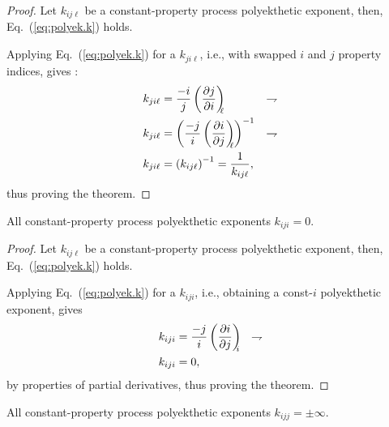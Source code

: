     \begin{proof}
        Let  $k_{ij\ell}$  be  a  constant-property   process   polyekthetic   exponent,   then,
        Eq.~(\ref{eq:polyek.k}) holds.

        Applying Eq.~(\ref{eq:polyek.k}) for a $k_{ji\ell}$, i.e.,  with  swapped  $i$  and  $j$
        property indices, gives :
        \begin{align}
            k_{ji\ell} &= \frac{-i}{j} \left(\frac{\partial {{j}}}{\partial {{i}}}\right)_{\!\!\!{\ell}}
                       & \rightharpoondown\\
            k_{ji\ell} &= \left(\frac{-j}{i} \left(\frac{\partial {{i}}}{\partial {{j}}}\right)_{\!\!\!{\ell}}\right)^{-1}
                       & \rightharpoondown\\
            k_{ji\ell} &= \left(k_{ij\ell}\right)^{-1} = \frac{1}{k_{ij\ell}},
        \end{align}
        \noindent thus proving the theorem.
    \end{proof}

    \begin{theorem}\label{the:k.consti}
        All constant-property process polyekthetic exponents $k_{iji} = 0$.
    \end{theorem}

    \begin{proof}
        Let  $k_{ij\ell}$  be  a  constant-property   process   polyekthetic   exponent,   then,
        Eq.~(\ref{eq:polyek.k}) holds.

        Applying  Eq.~(\ref{eq:polyek.k})  for  a  $k_{iji}$,  i.e.,   obtaining   a   const-$i$
        polyekthetic exponent, gives
        \begin{align}
            k_{iji} &= \frac{-j}{i} \left(\frac{\partial {{i}}}{\partial {{j}}}\right)_{\!\!\!{i}}
                    & \rightharpoondown\\
            k_{iji} &= 0,
        \end{align}
        \noindent by properties of partial derivatives, thus proving the theorem.
    \end{proof}

    \begin{theorem}\label{the:k.constj}
        All constant-property process polyekthetic exponents $k_{ijj} = \pm\infty$.
    \end{theorem}

